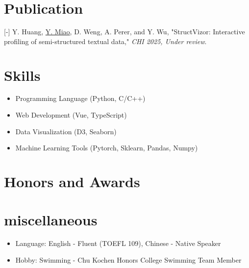 \documentclass{resume}
\begin{document}
\section{Publication}
{[-] Y. Huang, \uline{Y. Miao}, D. Weng, A. Perer, and Y. Wu, "StructVizor: Interactive profiling of
semi-structured textual data," \textit{CHI 2025, Under review}.}


\section{Skills}
\begin{itemize}[parsep=0.5ex]
    \item Programming Language (Python, C/C++)
    \item Web Development (Vue, TypeScript)
    \item Data Visualization (D3, Seaborn)
    \item Machine Learning Tools (Pytorch, Sklearn, Pandas, Numpy)
\end{itemize}

\section{Honors and Awards}

\section{miscellaneous}
\begin{itemize}[parsep=0.5ex]
  \item Language: English - Fluent (TOEFL 109), Chinese - Native Speaker
  \item Hobby: Swimming - Chu Kochen Honors College Swimming Team Member
\end{itemize}

%
%
\end{document}
